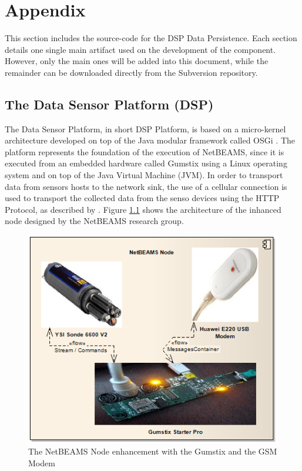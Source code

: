 \chapter{Appendix}

This section includes the source-code for the DSP Data Persistence. Each
section details one single main artifact used on the development of the
component. However, only the main ones will be added into this document, while
the remainder can be downloaded directly from the Subversion repository.

\section{The Data Sensor Platform (DSP)}
\label{sec:dsp-details}

The Data Sensor Platform, in short DSP Platform, is based on a micro-kernel
architecture developed on top of the Java modular framework called OSGi
\cite{osgi}. The platform represents the foundation of the execution of
NetBEAMS, since it is executed from an embedded hardware called Gumstix
\cite{gumstix} using a Linux operating system and on top of the Java Virtual
Machine (JVM). In order to transport data from sensors hosts to the network
sink, the use of a cellular connection is used to transport the collected data
from the senso devices using the HTTP Protocol, as described by
\citet{netbeams2009}. Figure \ref{fig:sf-netbeams-node} shows the
architecture of the inhanced node designed by the NetBEAMS research group.

\begin{figure}[h]
  \centering
  \includegraphics[scale=0.5]{../diagrams/DSP-Gateway-Node}
  \caption{The NetBEAMS Node enhancement with the Gumstix and the GSM Modem}
  \label{fig:sf-netbeams-node}
\end{figure}

